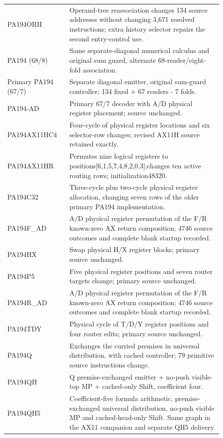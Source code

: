 \begin{longtable}{p{0.24\linewidth}p{0.64\linewidth}}
PA194ORH & Operand-tree reassociation changes 134 source addresses without changing 3,671 resolved instructions; extra history selector repairs the second entry-control use.\\[4pt]
PA194 (68/8) & Same separate-diagonal numerical calculus and original sum guard, alternate 68-reader/eight-fold association.\\[4pt]
Primary PA194 (67/7) & Separate diagonal emitter, original sum-guard controller; 134 fixed + 67 readers - 7 folds.\\[4pt]
PA194-AD & Primary 67/7 decoder with A/D physical register placement; source unchanged.\\[4pt]
PA194AX11HC4 & Four-cycle of physical register locations and six selector-row changes; revised AX11H source retained exactly.\\[4pt]
PA194AX11HR & Permutes nine logical registers to positions[6,1,5,7,4,8,2,0,3];changes ten active routing rows; initialization48320.\\[4pt]
PA194C32 & Three-cycle plus two-cycle physical register allocation, changing seven rows of the older primary PA194 implementation.\\[4pt]
PA194F\_AD & A/D physical register permutation of the F/R known-zero AX return composition; 4746 source outcomes and complete blank startup recorded.\\[4pt]
PA194HX & Swap physical H/X register blocks; primary source unchanged.\\[4pt]
PA194P5 & Five physical register positions and seven router targets change; primary source unchanged.\\[4pt]
PA194R\_AD & A/D physical register permutation of the F/R known-zero AX return composition; 4746 source outcomes and complete blank startup recorded.\\[4pt]
PA194TDY & Physical cycle of T/D/Y register positions and four router edits; primary source unchanged.\\[4pt]
PA194Q & Exchanges the curried premises in universal distribution, with cached controller; 79 primitive source instructions change.\\[4pt]
PA194QH & Q premise-exchanged emitter + no-push visible-top MP + cached-only Shift, coefficient four.\\[4pt]
PA194QH5 & Coefficient-five formula arithmetic, premise-exchanged universal distribution, no-push visible MP and cached-head-only Shift. Same graph in the AX11 companion and separate QH5 delivery.\\[4pt]

\end{longtable}
